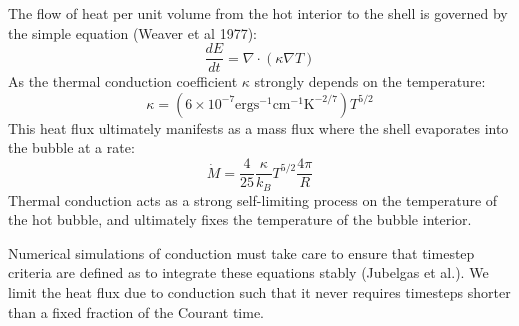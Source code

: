 \documentclass[extrafontsizes, 30pt]{memoir}
\begin{document}
The flow of heat per unit volume from the hot interior to the shell is
governed by the simple equation (Weaver et al 1977):
$$\frac{dE}{dt} = \nabla\cdot (\kappa \nabla T)$$
As the thermal conduction coefficient $\kappa$ strongly depends on the
temperature:
$$\kappa = (6\times10^{-7}  \mathrm{erg s^{-1} cm^{-1} K^{-2/7}})T^{5/2}$$
This heat flux ultimately manifests as a mass flux where the shell evaporates
into the bubble at a rate:
$$\dot M = \frac{4}{25}\frac{\kappa}{k_B} T^{5/2}\frac{4\pi}{R}$$
Thermal conduction acts as a strong self-limiting process on the temperature
of the hot bubble, and ultimately fixes the temperature of the bubble interior.

Numerical simulations of conduction must take care to ensure that timestep
criteria are defined as to integrate these equations stably (Jubelgas et al.).
We limit the heat flux due to conduction such that it never requires timesteps
shorter than a fixed fraction of the Courant time.
\end{document}
